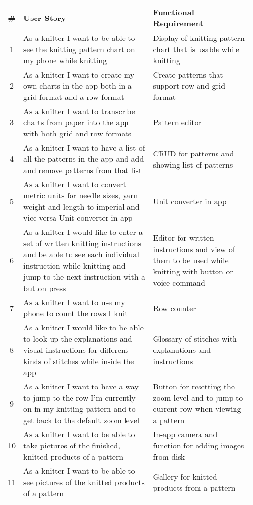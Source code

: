 \label{tabl:requirements}
\begin{longtable}{| c | p{6.5cm} | p{6.5cm} |}
    \hline
   	\# & User Story & Functional Requirement \\ \hline
   	\endhead
    1 &	As a knitter I want to be able to see the knitting pattern chart on my phone while knitting &
	 Display of knitting pattern chart that is usable while knitting \\ \hline
	2 & As a knitter I want to create my own charts in the app both in a grid format and a row format & Create patterns that support row and grid format \\ \hline
	3 & As a knitter I want to transcribe charts from paper into the app with both grid and row formats & Pattern editor \\ \hline
	4 & As a knitter I want to have a list of all the patterns in the app and add and remove patterns from that list & CRUD for patterns and showing list of patterns \\ \hline
	5 & As a knitter I want to convert metric units for needle sizes, yarn weight and length to imperial and vice versa Unit converter in app & Unit converter in app  \\ \hline
	6 & As a knitter I would like to enter a set of written knitting instructions and be able to see each individual instruction while knitting and jump to the next instruction with a button press & Editor for written instructions and view of them to be used while knitting with button or voice command \\ \hline
	7 & As a knitter I want to use my phone to count the rows I knit & Row counter \\ \hline
	8 & As a knitter I would like to be able to look up the explanations and visual instructions for different kinds of stitches while inside the app & Glossary of stitches with explanations and instructions \\ \hline
	9 & As a knitter I want to have a way to jump to the row I'm currently on in my knitting pattern and to get back to the default zoom level & Button for resetting the zoom level and to jump to current row when viewing a pattern \\ \hline
	10 & As a knitter I want to be able to take pictures of the finished, knitted products of a pattern & In-app camera and function for adding images from disk \\ \hline
	11 & As a knitter I want to be able to see pictures of the knitted products of a pattern & Gallery for knitted products from a pattern \\ \hline

\end{longtable}

